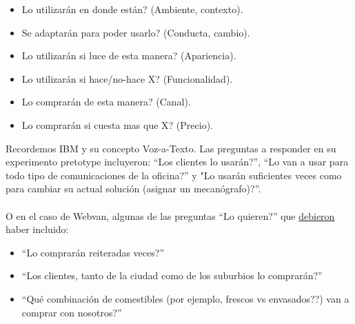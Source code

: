 \documentclass{article}
\begin{document}
\begin{itemize}
\item Lo utilizar\'an en donde est\'an? (Ambiente, contexto).
\item Se adaptar\'an para poder usarlo? (Conducta, cambio).
\item Lo utilizar\'an si luce de esta manera? (Apariencia).
\item Lo utilizar\'an si hace/no-hace X? (Funcionalidad).
\item Lo comprar\'an de esta manera? (Canal).
\item Lo comprar\'an si cuesta mas que X? (Precio).
\end{itemize}

Recordemos IBM y su concepto Voz-a-Texto. Las preguntas a responder en su experimento pretotype incluyeron: ``Los clientes lo usar\'an?'', ``Lo van a usar para todo tipo de comunicaciones de la oficina?'' y "Lo usar\'an suficientes veces como para cambiar su actual soluci\'on (asignar un mecan\'ografo)?''.
\\ \\
O en el caso de Webvan, algunas de las preguntas ``Lo quieren?'' que \underline{debieron} haber incluido:

\begin{itemize}
\item ``Lo comprar\'an reiteradas veces?''
\item ``Los clientes, tanto de la ciudad como de los suburbios lo comprar\'an?''
\item  ``Qu\'e combinaci\'on de comestibles (por ejemplo, frescos vs envasados??) van a comprar con nosotros?''
\end{itemize}
\end{document}
